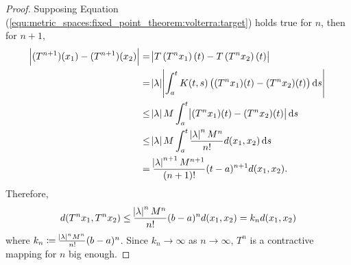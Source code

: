 \begin{example}
\begin{proof}
Supposing Equation (\ref{equ:metric_spaces:fixed_point_theorem:volterra:target}) 
holds true for $n$, then for $n + 1$, 
\begin{equation*}
    \begin{aligned}
        \abs{(T^{n+1})(x_1) - (T^{n+1}) (x_2)} 
        &= \abs{T\left( T^n x_1 \right)(t) - T\left( T^n x_2  \right)(t)} \\
        &= \abs{\lambda} \abs{\int_{a}^{t} K(t, s) 
            \left( (T^n x_1)(t) - (T^n x_2)(t) \right) \mathop{}\!\mathrm{d} s
        } \\ 
        &\le \abs{\lambda} M \int_{a}^{t} 
            \abs{(T^n x_1)(t) - (T^n x_2)(t)} \mathop{}\!\mathrm{d} s \\ 
        &\le \abs{\lambda} M \int_{a}^{t} 
            \frac{\abs{\lambda}^n M^n}{n!} d(x_1, x_2) \mathop{}\!\mathrm{d} s \\
        & = \frac{\abs{\lambda}^{n+1} 
            M^{n+1}}{(n+1)!} (t - a)^{n+1} d(x_1, x_2). 
    \end{aligned}
\end{equation*}
Therefore, 
\begin{equation*}
    d(T^nx_1, T^nx_2) \le \frac{\abs{\lambda}^n M^n}{n!} (b - a)^n 
        d(x_1, x_2) = k_n d(x_1, x_2)
\end{equation*}
where $k_n \coloneqq \frac{\abs{\lambda}^n M^n}{n!} (b - a)^n$. 
Since $k_n \to \infty$ as $n \to \infty$, $T^n$ is a contractive mapping 
for $n$ big enough. 
\end{proof}
\end{example}